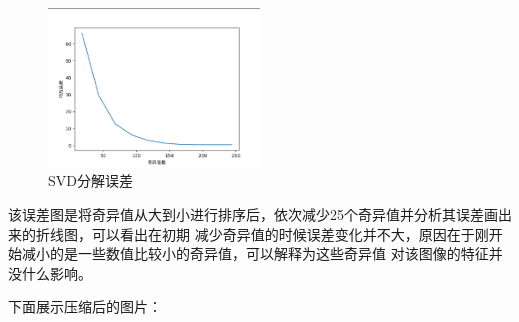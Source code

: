 \documentclass[UTF8]{ctexart}
\begin{document}
 \begin{figure}[htbp]
  \centering
  \includegraphics[width=0.5\textwidth]{3.png}
  \caption{SVD分解误差}
  \label{fig:example}
\end{figure}

该误差图是将奇异值从大到小进行排序后，依次减少25个奇异值并分析其误差画出来的折线图，可以看出在初期
减少奇异值的时候误差变化并不大，原因在于刚开始减小的是一些数值比较小的奇异值，可以解释为这些奇异值
对该图像的特征并没什么影响。 

下面展示压缩后的图片：
\end{document}
